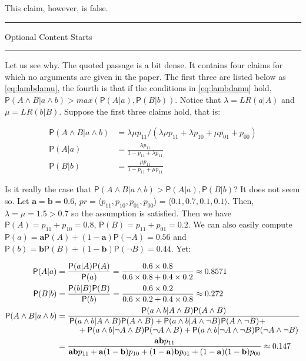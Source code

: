 \documentclass[10pt,dvipsnames,enabledeprecatedfontcommands]{scrartcl}
\newcommand{\ra}{\rangle}
\newcommand{\la}{\langle}
\newcommand{\n}{\neg}
\newcommand{\et}{\wedge}
\newcommand{\pr}[1]{\mathsf{P}(#1)}
\newcommand{\intermezzoa}{
	\begin{minipage}[c]{13cm}
	\begin{center}\rule{10cm}{0.4pt}



	\tiny{\sc Optional Content Starts}
	
	\vspace{-1mm}
	
	\rule{10cm}{0.4pt}\end{center}
	\end{minipage}\nopagebreak 
	}
\begin{document}
This claim, however, is false.

\intermezzoa

Let us see why. The quoted passage is a bit dense. It contains four
claims for which no arguments are given in the paper. The first three
are listed below as \eqref{eq:lambdamu}, the fourth is that if the
conditions in \eqref{eq:lambdamu} hold,
\(\pr{A\et B\vert a\et b}>max(\pr{A\vert a},\pr{B\vert b})\). Notice
that \(\lambda=LR(a\vert A)\) and \(\mu=LR(b\vert B)\). Suppose the
first three claims hold, that is:

\begin{align}\label{eq:lambdamu}
 \pr{A\et B\vert  a\et b} &= \lambda \mu p_{11}/(\lambda \mu p_{11} + \lambda p_{10} +\mu p_{01} + p_{00})\\
 \pr{A\vert a} & = \frac{\lambda p_{11}}{1-p_{11}+\lambda p_{11}}\nonumber \\
 \pr{B\vert b} & = \frac{\mu p_{11}}{1-p_{11}+\mu p_{11}} \nonumber 
 \end{align}

\noindent Is it really the case that
\(\pr{A\et B\vert a\et b}>\pr{A\vert a},\pr{B\vert b}\)? It does not
seem so. Let \(\mathbf{a}=\mathbf{b}=0.6\),
\(pr =\la p_{11},p_{10},p_{01},p_{00}\ra=\la 0.1, 0.7, 0.1, 0.1 \ra\).
Then, \(\lambda=\mu=1.5>0.7\) so the assumption is satisfied. Then we
have \(\pr{A}=p_{11}+p_{10}=0.8\), \(\pr{B}=p_{11}+p_{01}=0.2\). We can
also easily compute
\(\pr{a}=\mathbf{a}\pr{A}+(1-\mathbf{a})\pr{\n A}=0.56\) and
\(\pr{b}=\mathbf{b}\pr{B}+(1-\mathbf{b})\pr{\n B}=0.44\). Yet:

\begin{align*}
 \pr{A\vert a} & = \frac{\pr{a\vert A}\pr{A}}{\pr{a}} = \frac{0.6\times 0.8}{0.6\times 0.8 + 0.4\times 0.2}\approx 0.8571 \\
 \pr{B\vert b} & = \frac{\pr{b\vert B}\pr{B}}{\pr{b}} = \frac{0.6\times 0.2}{0.6\times 0.2 + 0.4\times 0.8}\approx 0.272 \\
 \pr{A\et B \vert a \et b} & = \frac{\pr{a\et b\vert A \et B}\pr{A\et B}}{\splitfrac{\pr{a\et b \vert A\et B}\pr{A\et B}+
   \pr{a\et b\vert A\et \n B}\pr{A\et \n B} +}{+ 
 \pr{a\et b \vert \n A \et B}\pr{\n A \et B} + \pr{a\et b \vert \n A \et \n B}\pr{\n A \et \n B}}} \\
 & = \frac{\mathbf{ab}p_{11}}{
   \mathbf{ab}p_{11} + \mathbf{a}(1-\mathbf{b})p_{10} + (1-\mathbf{a})\mathbf{b}p_{01} + (1-\mathbf{a})(1-\mathbf{b})p_{00}
 }  
    \approx 0.147
 \end{align*}
\end{document}
